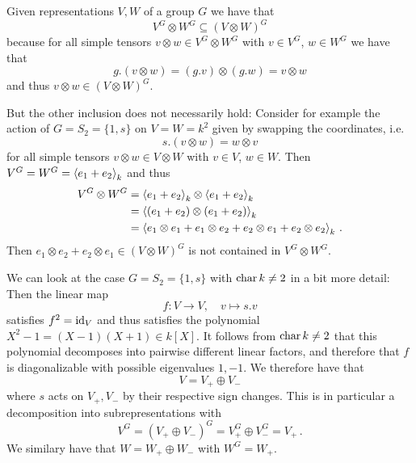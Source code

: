\begin{remark}
  Given representations $V, W$ of a group $G$ we have that
  \[
              V^G \otimes W^G
    \subseteq (V \otimes W)^G
  \]
  because for all simple tensors $v \otimes w \in V^G \otimes W^G$ with $v \in V^G$, $w \in W^G$ we have that
  \[
      g.(v \otimes w)
    = (g.v) \otimes (g.w)
    = v \otimes w
  \]
  and thus $v \otimes w \in (V \otimes W)^G$.
  
  But the other inclusion does not necessarily hold:
  Consider for example the action of $G = S_2 = \{1, s\}$ on $V = W = k^2$ given by swapping the coordinates, i.e.\
  \[
      s.(v \otimes w)
    = w \otimes v
  \]
  for all simple tensors $v \otimes w \in V \otimes W$ with $v \in V$, $w \in W$.
  Then $V^G = W^G = \left\langle  e_1 + e_2  \right\rangle_k$ and thus
  \begin{align*}
        V^G \otimes W^G
    &=  \left\langle  e_1 + e_2  \right\rangle_k \otimes \left\langle  e_1 + e_2  \right\rangle_k \\
    &=  \left\langle  (e_1 + e_2) \otimes (e_1 + e_2)  \right\rangle_k       \\
    &=  \left\langle  e_1 \otimes e_1 + e_1 \otimes e_2 + e_2 \otimes e_1 + e_2 \otimes e_2  \right\rangle_k \,.
  \end{align*}
  Then $e_1 \otimes e_2 + e_2 \otimes e_1 \in (V \otimes W)^G$ is not contained in $V^G \otimes W^G$.
  
  We can look at the case $G = S_2 = \{1, s\}$ with $\operatorname{char} k \neq 2$ in a bit more detail:
  Then the linear map
  \[
            f
    \colon  V
    \to     V,
    \quad   v
    \mapsto s.v
  \]
  satisfies $f^2 = \operatorname{id}_V$ and thus satisfies the polynomial $X^2 - 1 = (X-1)(X+1) \in k[X]$.
  It follows from $\operatorname{char} k \neq 2$ that this polynomial decomposes into pairwise different linear factors, and therefore that $f$ is diagonalizable with possible eigenvalues $1, -1$.
  We therefore have that
  \[
      V
    = V_+ \oplus V_-
  \]
  where $s$ acts on $V_+, V_-$ by their respective sign changes.
  This is in particular a decomposition into subrepresentations with
  \[
      V^G
    = (V_+ \oplus V_-)^G
    = V_+^G \oplus V_-^G
    = V_+ \,.
  \]
  We similary have that $W = W_+ \oplus W_-$ with $W^G = W_+$.
  

\end{remark}
